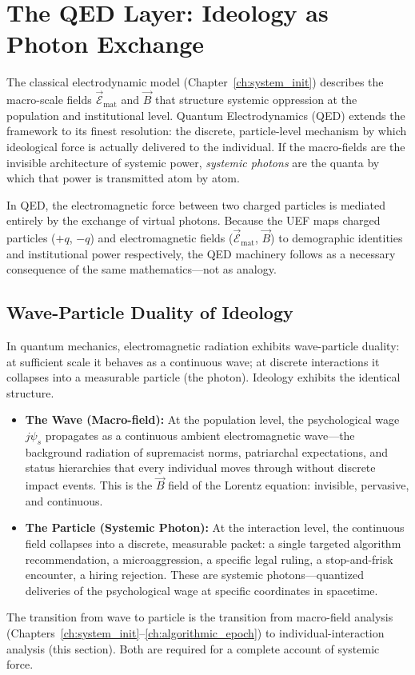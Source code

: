 \section{The QED Layer: Ideology as Photon Exchange}
\label{sec:qed_layer}

The classical electrodynamic model (Chapter~\ref{ch:system_init}) describes the macro-scale fields $\vec{\mathcal{E}}_{\text{mat}}$ and $\vec{B}$ that structure systemic oppression at the population and institutional level. Quantum Electrodynamics (QED) extends the framework to its finest resolution: the discrete, particle-level mechanism by which ideological force is actually delivered to the individual. If the macro-fields are the invisible architecture of systemic power, \emph{systemic photons} are the quanta by which that power is transmitted atom by atom.

In QED, the electromagnetic force between two charged particles is mediated entirely by the exchange of virtual photons. Because the UEF maps charged particles ($+q$, $-q$) and electromagnetic fields ($\vec{\mathcal{E}}_{\text{mat}}$, $\vec{B}$) to demographic identities and institutional power respectively, the QED machinery follows as a necessary consequence of the same mathematics---not as analogy.

\subsection{Wave-Particle Duality of Ideology}

In quantum mechanics, electromagnetic radiation exhibits wave-particle duality: at sufficient scale it behaves as a continuous wave; at discrete interactions it collapses into a measurable particle (the photon). Ideology exhibits the identical structure.

\begin{definition}
\begin{itemize}
\item \textbf{The Wave (Macro-field):} At the population level, the psychological wage $j\psi_s$ propagates as a continuous ambient electromagnetic wave---the background radiation of supremacist norms, patriarchal expectations, and status hierarchies that every individual moves through without discrete impact events. This is the $\vec{B}$ field of the Lorentz equation: invisible, pervasive, and continuous.

\item \textbf{The Particle (Systemic Photon):} At the interaction level, the continuous field collapses into a discrete, measurable packet: a single targeted algorithm recommendation, a microaggression, a specific legal ruling, a stop-and-frisk encounter, a hiring rejection. These are systemic photons---quantized deliveries of the psychological wage at specific coordinates in spacetime.
\end{itemize}

The transition from wave to particle is the transition from macro-field analysis (Chapters~\ref{ch:system_init}--\ref{ch:algorithmic_epoch}) to individual-interaction analysis (this section). Both are required for a complete account of systemic force.
\end{definition}

